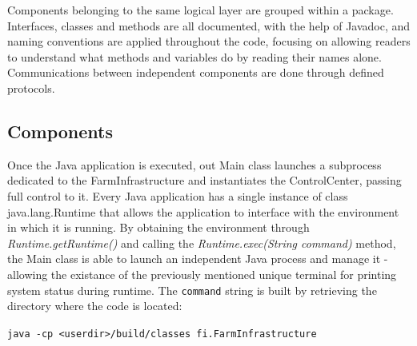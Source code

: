 \documentclass[12pt]{article}
\begin{document}
Components belonging to the same logical layer are grouped within a package.
Interfaces, classes and methods are all documented, with the help of Javadoc, and naming conventions are applied throughout the code, focusing on allowing readers 
to understand what methods and variables do by reading their names alone.
Communications between independent components are done through defined protocols. 

\subsection{Components} %

Once the Java application is executed, out Main class launches a subprocess dedicated to the FarmInfrastructure and instantiates the ControlCenter, passing full 
control to it.
Every Java application has a single instance of class java.lang.Runtime that allows the application to interface with the environment in which it is running.
By obtaining the environment through \textit{Runtime.getRuntime()} and calling the \textit{Runtime.exec(String command)} method, the Main class is able to launch 
an independent Java process and manage it - allowing the existance of the previously mentioned unique terminal for printing system status during runtime.
The \texttt{command} string is built by retrieving the directory where the code is located: 

\texttt{java -cp <userdir>/build/classes fi.FarmInfrastructure}
\end{document}
